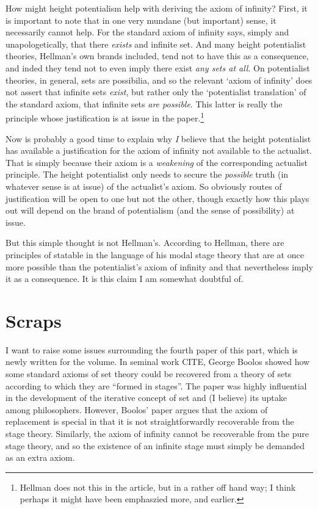 \documentclass{asl}
\theoremstyle{definition}
\begin{document}
How might height potentialism help with deriving the axiom of infinity? 
First, it is important to note that in one very mundane (but important) sense,
it necessarily cannot help. For the standard axiom of infinity says, 
simply and unapologetically, 
that there \emph{exists} and infinite set. And many height potentialist theories, 
Hellman's own brands included, 
tend not to have this as a consequence, and inded they tend not 
to even imply there exist \emph{any sets at all}. 
On potentialist theories, in general, sets are possibilia, 
and so the relevant `axiom of infinity' does not assert that 
infinite sets \emph{exist}, but rather 
only the `potentialist translation' of the standard axiom, 
that infinite sets \emph{are possible}. 
This latter is really the principle 
whose justification is at issue in the paper.\footnote{ 
    Hellman does not this in the article, but in a rather off hand way;
    I think perhaps it might have been emphaszied more, and earlier.
    }

Now is probably a good time to explain why 
\emph{I} 
believe that the height potentialist 
has available a justification for the axiom of infinity 
not available to the actualist. 
That is simply because their axiom is a 
\emph{ weakening } 
of the corresponding actualist principle. 
The height potentialist only needs to secure the 
\emph{possible} 
truth 
(in whatever sense is at issue) 
of the actualist's axiom. So obviously routes of justification 
will be open to one but not the other, though exactly how this plays out 
will depend on the brand of potentialism (and the sense of possibility) at issue.

But this simple thought is not Hellman's. 
According to Hellman, 
there are principles of statable in the language of his modal stage theory 
that are at once more possible than the potentialist's axiom of infinity 
and that nevertheless imply it as a consequence. 
It is this claim I am somewhat doubtful of.




\section{Scraps}
I want to raise some issues surrounding 
the fourth paper of this part, 
which is newly written for the volume. 
In seminal work CITE, George Boolos showed 
how some standard axioms of set theory could 
be recovered from a theory of sets according 
to which they are ``formed in stages''. 
The paper was highly influential in the 
development of the iterative concept of 
set and (I believe) its uptake among philosophers. 
However, Boolos' paper argues that the axiom of 
replacement is special in that it is not 
straightforwardly recoverable from the stage theory. 
Similarly, the axiom of infinity cannot be recoverable 
from the pure stage theory, 
and so the existence of an infinite stage must 
simply be demanded as an extra axiom. 
\end{document}
